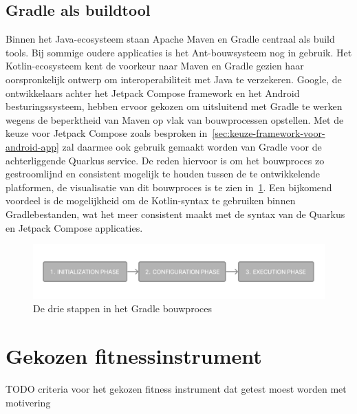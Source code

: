\subsection{Gradle als buildtool}
\label{subsec:gradle}
Binnen het Java-ecosysteem staan Apache Maven en Gradle centraal als build tools.
Bij sommige oudere applicaties is het Ant-bouwsysteem nog in gebruik.
Het Kotlin-ecosysteem kent de voorkeur naar Maven en Gradle gezien haar oorspronkelijk ontwerp om interoperabiliteit met Java te verzekeren.
Google, de ontwikkelaars achter het Jetpack Compose framework en het Android besturingssysteem, hebben ervoor gekozen om uitsluitend met Gradle te werken wegens de beperktheid van Maven op vlak van bouwprocessen opstellen.
Met de keuze voor Jetpack Compose zoals besproken in~\ref{sec:keuze-framework-voor-android-app} zal daarmee ook gebruik gemaakt worden van Gradle voor de achterliggende Quarkus service.
De reden hiervoor is om het bouwproces zo gestroomlijnd en consistent mogelijk te houden tussen de te ontwikkelende platformen, de visualisatie van dit bouwproces is te zien in~\ref{fig:visualisatie-gradle-bouwproces}.
Een bijkomend voordeel is de mogelijkheid om de Kotlin-syntax te gebruiken binnen Gradlebestanden, wat het meer consistent maakt met de syntax van de Quarkus en Jetpack Compose applicaties.
\begin{figure}[H]
    \includegraphics[width=1\linewidth]{images/gradle-buildprocess}
    \caption{De drie stappen in het Gradle bouwproces~\autocite{Gradle}}
    \label{fig:visualisatie-gradle-bouwproces}
\end{figure}

\section{Gekozen fitnessinstrument}
\label{sec:gekozen-fitnessinstrument}
TODO criteria voor het gekozen fitness instrument dat getest moest worden met motivering %